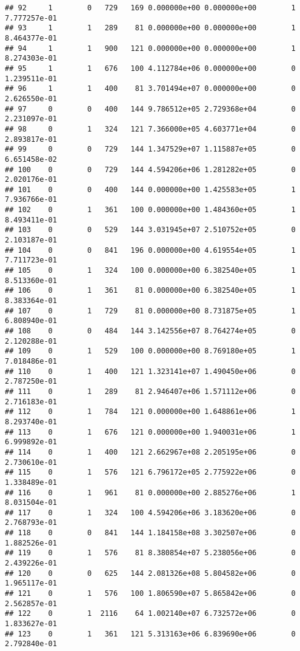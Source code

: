 \documentclass[
]{article}
\begin{document}
\begin{enumerate}
\begin{verbatim}
## 92     1        0   729   169 0.000000e+00 0.000000e+00        1  7.777257e-01
## 93     1        1   289    81 0.000000e+00 0.000000e+00        1  8.464377e-01
## 94     1        1   900   121 0.000000e+00 0.000000e+00        1  8.274303e-01
## 95     1        1   676   100 4.112784e+06 0.000000e+00        0  1.239511e-01
## 96     1        1   400    81 3.701494e+07 0.000000e+00        0  2.626550e-01
## 97     0        0   400   144 9.786512e+05 2.729368e+04        0  2.231097e-01
## 98     0        1   324   121 7.366000e+05 4.603771e+04        0  2.893817e-01
## 99     0        0   729   144 1.347529e+07 1.115887e+05        0  6.651458e-02
## 100    0        0   729   144 4.594206e+06 1.281282e+05        0  2.020176e-01
## 101    0        0   400   144 0.000000e+00 1.425583e+05        1  7.936766e-01
## 102    0        1   361   100 0.000000e+00 1.484360e+05        1  8.493411e-01
## 103    0        0   529   144 3.031945e+07 2.510752e+05        0  2.103187e-01
## 104    0        0   841   196 0.000000e+00 4.619554e+05        1  7.711723e-01
## 105    0        1   324   100 0.000000e+00 6.382540e+05        1  8.513360e-01
## 106    0        1   361    81 0.000000e+00 6.382540e+05        1  8.383364e-01
## 107    0        1   729    81 0.000000e+00 8.731875e+05        1  6.808940e-01
## 108    0        0   484   144 3.142556e+07 8.764274e+05        0  2.120288e-01
## 109    0        1   529   100 0.000000e+00 8.769180e+05        1  7.018486e-01
## 110    0        1   400   121 1.323141e+07 1.490450e+06        0  2.787250e-01
## 111    0        1   289    81 2.946407e+06 1.571112e+06        0  2.716183e-01
## 112    0        1   784   121 0.000000e+00 1.648861e+06        1  8.293740e-01
## 113    0        1   676   121 0.000000e+00 1.940031e+06        1  6.999892e-01
## 114    0        1   400   121 2.662967e+08 2.205195e+06        0  2.730610e-01
## 115    0        1   576   121 6.796172e+05 2.775922e+06        0  1.338489e-01
## 116    0        1   961    81 0.000000e+00 2.885276e+06        1  8.031504e-01
## 117    0        1   324   100 4.594206e+06 3.183620e+06        0  2.768793e-01
## 118    0        0   841   144 1.184158e+08 3.302507e+06        0  1.882526e-01
## 119    0        1   576    81 8.380854e+07 5.238056e+06        0  2.439226e-01
## 120    0        0   625   144 2.081326e+08 5.804582e+06        0  1.965117e-01
## 121    0        1   576   100 1.806590e+07 5.865842e+06        0  2.562857e-01
## 122    0        1  2116    64 1.002140e+07 6.732572e+06        0  1.833627e-01
## 123    0        1   361   121 5.313163e+06 6.839690e+06        0  2.792840e-01

\end{verbatim}
\end{enumerate}
\end{document}
